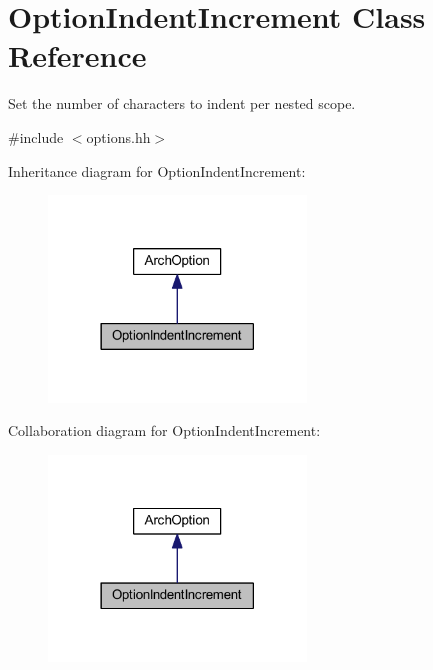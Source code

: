 \hypertarget{class_option_indent_increment}{}\section{Option\+Indent\+Increment Class Reference}
\label{class_option_indent_increment}


Set the number of characters to indent per nested scope.  




{\ttfamily \#include $<$options.\+hh$>$}



Inheritance diagram for Option\+Indent\+Increment\+:
\nopagebreak
\begin{figure}[H]
\begin{center}
\leavevmode
\includegraphics[width=194pt]{class_option_indent_increment__inherit__graph}
\end{center}
\end{figure}


Collaboration diagram for Option\+Indent\+Increment\+:
\nopagebreak
\begin{figure}[H]
\begin{center}
\leavevmode
\includegraphics[width=194pt]{class_option_indent_increment__coll__graph}
\end{center}
\end{figure}
